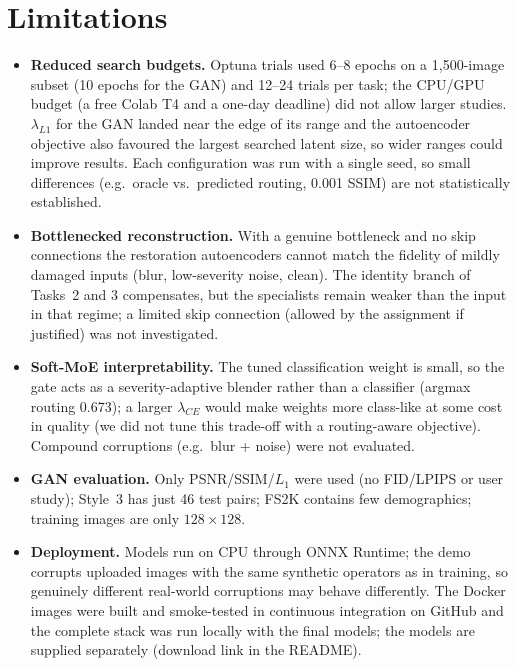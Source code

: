\section{Limitations}
\label{sec:limits}
\begin{itemize}
\item \textbf{Reduced search budgets.} Optuna trials used 6--8 epochs on a 1{,}500-image subset (10 epochs for the GAN) and 12--24 trials per task; the CPU/GPU budget (a free Colab T4 and a one-day deadline) did not allow larger studies. $\lambda_{L1}$ for the GAN landed near the edge of its range and the autoencoder objective also favoured the largest searched latent size, so wider ranges could improve results. Each configuration was run with a single seed, so small differences (e.g.\ oracle vs.\ predicted routing, 0.001 SSIM) are not statistically established.
\item \textbf{Bottlenecked reconstruction.} With a genuine bottleneck and no skip connections the restoration autoencoders cannot match the fidelity of mildly damaged inputs (blur, low-severity noise, clean). The identity branch of Tasks~2 and 3 compensates, but the specialists remain weaker than the input in that regime; a limited skip connection (allowed by the assignment if justified) was not investigated.
\item \textbf{Soft-MoE interpretability.} The tuned classification weight is small, so the gate acts as a severity-adaptive blender rather than a classifier (argmax routing 0.673); a larger $\lambda_{CE}$ would make weights more class-like at some cost in quality (we did not tune this trade-off with a routing-aware objective). Compound corruptions (e.g.\ blur + noise) were not evaluated.
\item \textbf{GAN evaluation.} Only PSNR/SSIM/$L_1$ were used (no FID/LPIPS or user study); Style~3 has just 46 test pairs; FS2K contains few demographics; training images are only $128\times128$.
\item \textbf{Deployment.} Models run on CPU through ONNX Runtime; the demo corrupts uploaded images with the same synthetic operators as in training, so genuinely different real-world corruptions may behave differently. The Docker images were built and smoke-tested in continuous integration on GitHub and the complete stack was run locally with the final models; the models are supplied separately (download link in the README).
\end{itemize}


